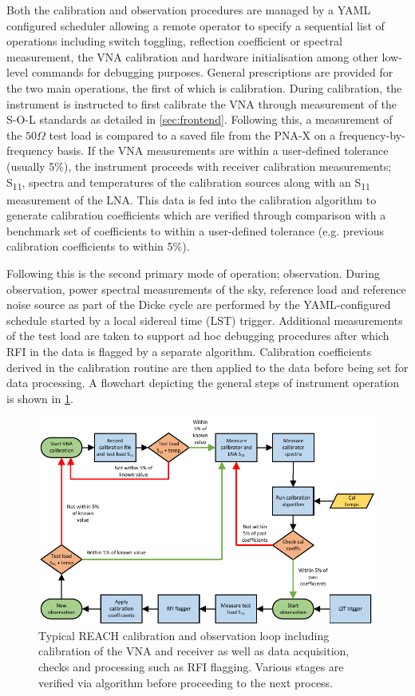 Both the calibration and observation procedures are managed by a YAML configured scheduler allowing a remote operator to specify a sequential list of operations including switch toggling, reflection coefficient or spectral measurement, the VNA calibration and hardware initialisation among other low-level commands for debugging purposes. General prescriptions are provided for the two main operations, the first of which is calibration. During calibration, the instrument is instructed to first calibrate the VNA through measurement of the S-O-L standards as detailed in \cref{sec:frontend}. Following this, a measurement of the $50 \Omega$ test load is compared to a saved file from the PNA-X on a frequency-by-frequency basis. If the VNA measurements are within a user-defined tolerance (usually 5\%), the instrument proceeds with receiver calibration measurements; S\textsubscript{11}, spectra and temperatures of the calibration sources along with an S\textsubscript{11} measurement of the LNA. This data is fed into the calibration algorithm to generate calibration coefficients which are verified through comparison with a benchmark set of coefficients to within a user-defined tolerance (e.g. previous calibration coefficients to within 5\%).

Following this is the second primary mode of operation; observation. During observation, power spectral measurements of the sky, reference load and reference noise source as part of the Dicke cycle are performed by the YAML-configured schedule started by a local sidereal time (LST) trigger. Additional measurements of the test load are taken to support ad hoc debugging procedures after which RFI in the data is flagged by a separate algorithm. Calibration coefficients derived in the calibration routine are then applied to the data before being set for data processing. A flowchart depicting the general steps of instrument operation is shown in \cref{fig:obs_flowchart}.
\begin{figure}
    \centering
    \includegraphics[width=\columnwidth]{updated_reach_obs_loop}
    \caption{Typical REACH calibration and observation loop including calibration of the VNA and receiver as well as data acquisition, checks and processing such as RFI flagging. Various stages are verified via algorithm before proceeding to the next process.}
    \label{fig:obs_flowchart}
\end{figure}


